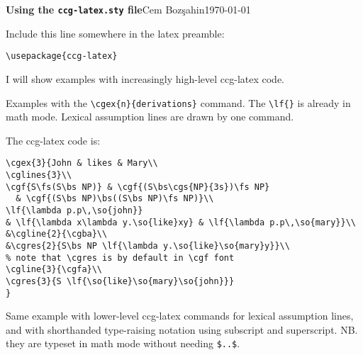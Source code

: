 \documentclass[11pt]{article}
\begin{document}
{\Large\bf Using the \verb|ccg-latex.sty| file}\hfill{\small Cem Boz\c{s}ahin}\hfill\today\medskip\bigskip

Include this line somewhere in the latex preamble:\bigskip

\begin{verbatim}
\usepackage{ccg-latex}
\end{verbatim}\bigskip

I will show examples with increasingly high-level ccg-latex code.\bigskip

Examples with the \verb|\cgex{n}{derivations}| command. The \verb|\lf{}| is already in math mode.
Lexical assumption lines are drawn by one command.
\bigskip

\medskip\bigskip

The ccg-latex code is:

\begin{verbatim}
\cgex{3}{John & likes & Mary\\
\cglines{3}\\
\cgf{S\fs(S\bs NP)} & \cgf{(S\bs\cgs{NP}{3s})\fs NP} 
  & \cgf{(S\bs NP)\bs((S\bs NP)\fs NP)}\\
\lf{\lambda p.p\,\so{john}} 
& \lf{\lambda x\lambda y.\so{like}xy} & \lf{\lambda p.p\,\so{mary}}\\
&\cgline{2}{\cgba}\\
&\cgres{2}{S\bs NP \lf{\lambda y.\so{like}\so{mary}y}}\\  
% note that \cgres is by default in \cgf font
\cgline{3}{\cgfa}\\
\cgres{3}{S \lf{\so{like}\so{mary}\so{john}}}
}
\end{verbatim}

\newpage
Same example with lower-level ccg-latex commands for lexical assumption lines, and with shorthanded 
type-raising notation using subscript and superscript. NB. they are typeset in math mode without needing \verb|$..$|.\bigskip
\end{document}
